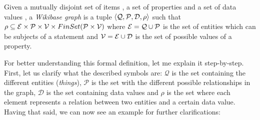 \begin{definition}
    Given a mutually disjoint set of items \ItemSet{}, a set of properties \PropSet{} and a set of data values \DataValueSet{}, a \emph{Wikibase graph} is a tuple $\langle\mathcal{Q},\mathcal{P},\mathcal{D},\rho\rangle$ such that $\rho\subseteq\mathcal{E}\times\mathcal{P}\times\mathcal{V}\times FinSet(\mathcal{P}\times\mathcal{V})$ where $\mathcal{E}=\mathcal{Q}\cup\mathcal{P}$ is the set of entities which can be subjects of a statement and $\mathcal{V}=\mathcal{E}\cup\mathcal{D}$ is the set of possible values of a property.
\end{definition}

For better understanding this formal definition, let me explain it step-by-step. First, let us clarify what the described symbols are: $\mathcal{Q}$ is the set containing the different entities (\textit{things}), $\mathcal{P}$ is the set with the different possible relationships in the graph, $\mathcal{D}$ is the set containing data values and $\rho$ is the set where each element represents a relation between two entities and a certain data value. Having that said, we can now see an example for further clarifications:

